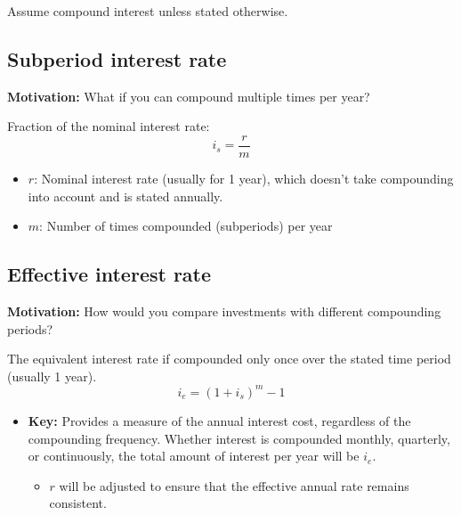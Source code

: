 \begin{warning}
    Assume compound interest unless stated otherwise.
\end{warning}



\subsection{Subperiod interest rate}
\textbf{Motivation:} What if you can compound multiple times per year?
\begin{definition}
    Fraction of the nominal interest rate:
    \begin{equation}
        i_s = \frac{r}{m}
    \end{equation}
    \begin{itemize}
        \item \(r\): Nominal interest rate (usually for 1 year), which doesn't take compounding into account and is stated annually.
        \item \(m\): Number of times compounded (subperiods) per year
    \end{itemize}
\end{definition}

\subsection{Effective interest rate}
\textbf{Motivation:} How would you compare investments with different compounding periods?
\begin{definition}
    The equivalent interest rate if compounded only once over the stated time period (usually 1 year).
    \begin{equation}
        i_e = (1 + i_s)^m - 1
    \end{equation}
    \begin{itemize}
        \item \textbf{Key:} Provides a measure of the annual interest cost, regardless of the compounding frequency. Whether interest is compounded monthly, quarterly, or continuously, the total amount of interest per year will be $i_e$. 
        \begin{itemize}
            \item $r$ will be adjusted to ensure that the effective annual rate remains consistent. 
        \end{itemize}
    \end{itemize}
\end{definition}

